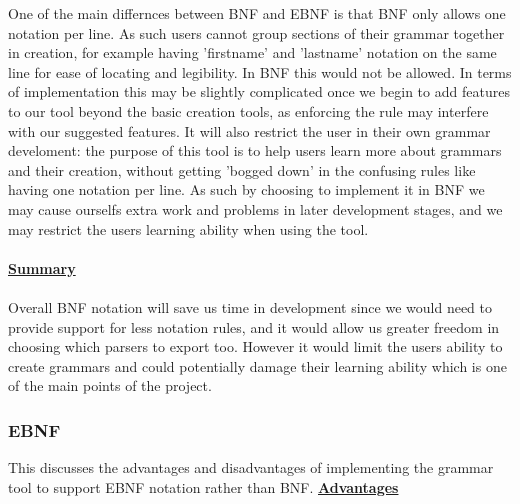 \documentclass{l3proj}
\begin{document}
One of the main differnces between BNF and EBNF is that BNF only allows one notation per line. As such users cannot group sections of their grammar together in creation, for example having 'firstname' and 'lastname' notation on the same line for ease of locating and legibility. In BNF this would not be allowed. In terms of implementation this may be slightly complicated once we begin to add features to our tool beyond the basic creation tools, as enforcing the rule may interfere with our suggested features. It will also restrict the user in their own grammar develoment: the purpose of this tool is to help users learn more about grammars and their creation, without getting 'bogged down' in the confusing rules like having one notation per line. As such by choosing to implement it in BNF we may cause ourselfs extra work and problems in later development stages, and we may restrict the users learning ability when using the tool. \\
\\
\textbf {\underline{Summary}}\\
\\
Overall BNF notation will save us time in development since we would need to provide support for less notation rules, and it would allow us greater freedom in choosing which parsers to export too. However it would limit the users ability to create grammars and could potentially damage their learning ability which is one of the main points of the project.

\subsubsection{EBNF}
This discusses the advantages and disadvantages of implementing the grammar tool to support EBNF notation rather than BNF. 
\textbf {\underline{Advantages}}
\end{document}
